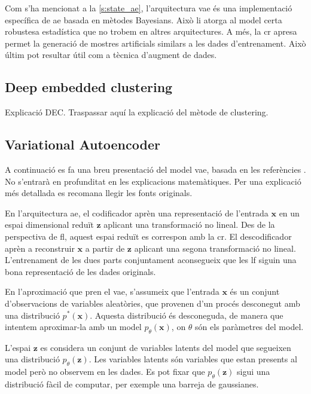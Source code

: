 \documentclass[CAT,BIB]{TFUOC}%
\newcommand{\todo}[1]{
            \begin{tcolorbox}[title=ToDo!, colback=red!5!white, colframe=red!50!black, coltext=red!50!black]
            #1
            \end{tcolorbox}}
\begin{document}
    Com s'ha mencionat a la \cref{s:state_ae},
    l'arquitectura \gls{vae} és una implementació específica de \gls{ae}
    basada en mètodes Bayesians.
    Això li atorga al model certa robustesa estadística
    que no trobem en altres arquitectures.
    A més,
    la \gls{cr} apresa permet la generació de mostres artificials
    similars a les dades d'entrenament.
    Això últim pot resultar útil com a tècnica d'augment de dades.

    \subsection{Deep embedded clustering}
    \label{s:metodes_dec}

\todo{Explicació DEC. Traspassar aquí la explicació del mètode de clustering.}


    \subsection{Variational Autoencoder}
    \label{s:metodes_vae}

        A continuació es fa una breu presentació del model \gls{vae},
        basada en les referències \citep{Kingma2014,Kingma2019}.
        No s'entrarà en profunditat en les explicacions matemàtiques.
        Per una explicació més detallada es recomana llegir les fonts originals.

        En l'arquitectura \gls{ae},
        el codificador aprèn una representació de l'entrada $\mathbf{x}$
        en un espai dimensional reduït $\mathbf{z}$
        aplicant una transformació no lineal.
        Des de la perspectiva de \gls{fl},
        aquest espai reduït es correspon amb la \gls{cr}.
        El descodificador aprèn a reconstruir $\mathbf{x}$ a partir de $\mathbf{z}$
        aplicant una segona transformació no lineal.
        L'entrenament de les dues parts conjuntament
        aconsegueix que les \gls{lf} siguin una bona representació de les dades originals.

        En l'aproximació que pren el \gls{vae},
        s'assumeix que l'entrada $\mathbf{x}$ és un conjunt d'observacions de variables aleatòries,
        que provenen d'un procés desconegut
        amb una distribució $p^*(\mathbf{x})$.
        Aquesta distribució és desconeguda,
        de manera que intentem aproximar-la amb un model $p_\theta(\mathbf{x})$,
        on $\theta$ són els paràmetres del model.

        L'espai $\mathbf{z}$ es considera un conjunt de variables latents del model
        que segueixen una distribució $p_\theta(\mathbf{z})$.
        Les variables latents són variables que estan presents al model però no observem en les dades.
        Es pot fixar que $p_\theta(\mathbf{z})$ sigui una distribució fàcil de computar,
        per exemple una barreja de gaussianes.
\end{document}
